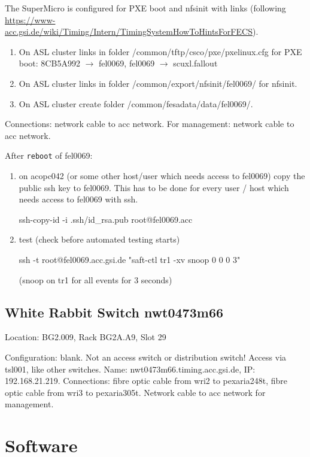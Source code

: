 \documentclass[12pt,a4paper]{report}
\begin{document}
The SuperMicro is configured for PXE boot and nfsinit with links (following
\url{https://www-acc.gsi.de/wiki/Timing/Intern/TimingSystemHowToHintsForFECS}).
\begin{enumerate}
\item On ASL cluster links in folder /common/tftp/csco/pxe/pxelinux.cfg for PXE boot:
8CB5A992 $\to$ fel0069,
fel0069 $\to$ scuxl.fallout
\item On ASL cluster links in folder /common/export/nfsinit/fel0069/ for nfsinit.
\item On ASL cluster create folder /common/fesadata/data/fel0069/.
\end{enumerate}
Connections: network cable to acc network. For management: network cable to acc network.

After \texttt{reboot} of fel0069:
\begin{enumerate}
\item on acopc042 (or some other host/user which needs access to fel0069) copy the public ssh key to fel0069.
This has to be done for every user / host which needs access to fel0069 with ssh.\raggedright
\linebreak ssh-copy-id -i .ssh/id\_rsa.pub root@fel0069.acc

\item test (check before automated testing starts)\raggedright
\linebreak ssh -t root@fel0069.acc.gsi.de "saft-ctl tr1 -xv snoop 0 0 0 3"\raggedright
\linebreak (snoop on tr1 for all events for 3 seconds)
\end{enumerate}

\section{White Rabbit Switch nwt0473m66}
Location: BG2.009, Rack BG2A.A9, Slot 29 \raggedright
\linebreak Configuration: blank. Not an access switch or distribution switch!
\linebreak Access via tsl001, like other switches.
\linebreak Name: nwt0473m66.timing.acc.gsi.de,
\linebreak IP: 192.168.21.219.
\linebreak Connections: fibre optic cable from wri2 to pexaria248t, fibre optic cable from wri3 to pexaria305t. Network cable to acc network for management.
\chapter{Software}
\end{document}

